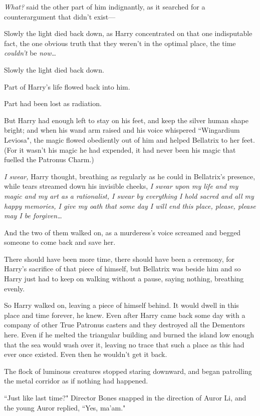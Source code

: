 \emph{What?} said the other part of him indignantly, as it searched for a counterargument that didn't exist—

Slowly the light died back down, as Harry concentrated on that one indisputable fact, the one obvious truth that they weren't in the optimal place, the time \emph{couldn't} be \emph{now{\ldots}}

Slowly the light died back down.

Part of Harry's life flowed back into him.

Part had been lost as radiation.

But Harry had enough left to stay on his feet, and keep the silver human shape bright; and when his wand arm raised and his voice whispered ``Wingardium Leviosa", the magic flowed obediently out of him and helped Bellatrix to her feet. (For it wasn't his magic he had expended, it had never been his magic that fuelled the Patronus Charm.)

\emph{I swear,} Harry thought, breathing as regularly as he could in Bellatrix's presence, while tears streamed down his invisible cheeks, \emph{I swear upon my life and my magic and my art as a rationalist, I swear by everything I hold sacred and all my happy memories, I give my oath that some day I will end this place, please, please may I be forgiven{\ldots}}

And the two of them walked on, as a murderess's voice screamed and begged someone to come back and save her.

There should have been more time, there should have been a ceremony, for Harry's sacrifice of that piece of himself, but Bellatrix was beside him and so Harry just had to keep on walking without a pause, saying nothing, breathing evenly.

So Harry walked on, leaving a piece of himself behind. It would dwell in this place and time forever, he knew. Even after Harry came back some day with a company of other True Patronus casters and they destroyed all the Dementors here. Even if he melted the triangular building and burned the island low enough that the sea would wash over it, leaving no trace that such a place as this had ever once existed. Even then he wouldn't get it back.

\later

The flock of luminous creatures stopped staring downward, and began patrolling the metal corridor as if nothing had happened.

``Just like last time?" Director Bones snapped in the direction of Auror Li, and the young Auror replied, ``Yes, ma'am."

